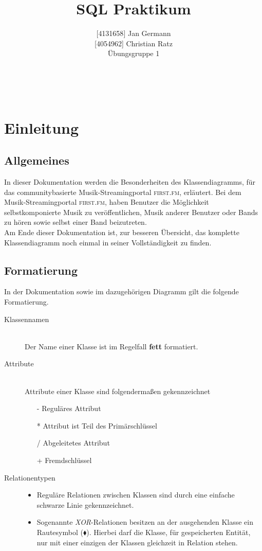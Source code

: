 \documentclass[11pt,a4paper,DIV=9]{scrartcl}
\author{{[}4131658{]} Jan Germann \\{[}4054962{]} Christian Ratz\\Übungsgruppe 1}
\title{SQL Praktikum}
\renewcommand{\author}[1]{\renewcommand{\author}{#1}}
\renewcommand{\title}[1]{\renewcommand{\title}{#1}}
\newcommand{\makehomeworktitle}{
  \begin{minipage}[t]{6.5cm}
    \sf{\author}
  \end{minipage}
  \begin{minipage}[t]{6.5cm}
    \begin{flushright}
      \sf{\title\\\today}
    \end{flushright}
  \end{minipage}
  \\[0.2cm]
  \begin{center}
    \sf{
      \color{blue}{
        \LARGE{Dokumentation \blattnr}
      }
    }
  \end{center}
  \vspace{0.1cm}
}
\begin{document}
\makehomeworktitle
\tableofcontents
\newpage
\section{Einleitung}
  \subsection{Allgemeines}
    In dieser Dokumentation werden die Besonderheiten des Klassendiagramms, für das communitybasierte Musik-Streamingportal \textsc{first.fm}, erläutert. Bei dem Musik-Streamingportal \textsc{first.fm}, haben Benutzer die Möglichkeit selbstkomponierte Musik zu veröffentlichen, Musik anderer Benutzer oder Bands zu hören sowie selbst einer Band beizutreten.\\
    Am Ende dieser Dokumentation ist, zur besseren Übersicht, das komplette Klassendiagramm noch einmal in seiner Vollständigkeit zu finden.

  \subsection{Formatierung} 
    In der Dokumentation sowie im dazugehörigen Diagramm gilt die folgende Formatierung.

    \begin{description}
      \item [Klassennamen] \hfill \\
        Der Name einer Klasse ist im Regelfall \textbf{fett} formatiert.
      \item [Attribute] \hfill \\
        Attribute einer Klasse sind folgendermaßen gekennzeichnet
        \begin{itemize}
          \item[-] Reguläres Attribut
          \item[*] Attribut ist Teil des Primärschlüssel
          \item[/] Abgeleitetes Attribut
          \item[+] Fremdschlüssel
        \end{itemize}
      \item[Relationentypen] \hfill
      \begin{itemize}
        \item Reguläre Relationen zwischen Klassen sind durch eine einfache schwarze Linie gekennzeichnet.
        \item Sogenannte \textit{XOR}-Relationen besitzen an der ausgehenden Klasse ein Rautesymbol ($\blacklozenge$). Hierbei darf die Klasse, für gespeicherten Entität, nur mit einer einzigen der Klassen gleichzeit in Relation stehen.
      \end{itemize}
    \end{description}
\end{document}

